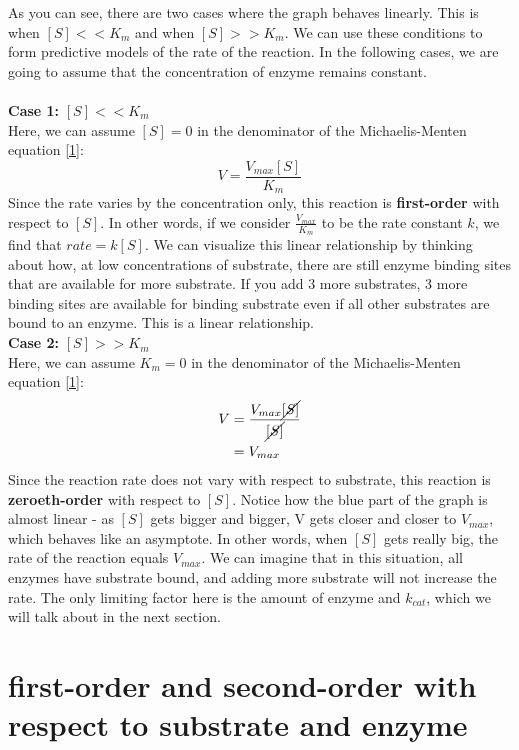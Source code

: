 \documentclass{article}
\begin{document}
As you can see, there are two cases where the graph behaves linearly. This is when $[S]<<K_m$ and when $[S]>>K_m$. We can use these conditions to form predictive models of the rate of the reaction. In the following cases, we are going to assume that the concentration of enzyme remains constant.\\
\\
\hypertarget{case 1}{\textbf{Case 1:}} $[S]<<K_m$\\
Here, we can assume $[S] = 0$ in the denominator of the Michaelis-Menten equation \eqref{1}:\\
\begin{equation}
    V = \frac{V_{max}[S]}{K_m}
\end{equation}
Since the rate varies by the concentration only, this reaction is \textbf{first-order} with respect to $[S]$. In other words, if we consider $\frac{V_{max}}{K_m}$ to be the rate constant $k$, we find that $rate = k[S]$. We can visualize this linear relationship by thinking about how, at low concentrations of substrate, there are still enzyme binding sites that are available for more substrate. If you add 3 more substrates, 3 more binding sites are available for binding substrate even if all other substrates are bound to an enzyme. This is a linear relationship.\\
\newpage
\hypertarget{case 2}{\textbf{Case 2:}} $[S]>>K_m$\\
Here, we can assume $K_m = 0$ in the denominator of the Michaelis-Menten equation \eqref{1}:\\
\begin{align}
    V &= \frac{V_{max}\cancel{[S]}}{\cancel{[S]}} \nonumber \\
    &= V_{max}
\end{align}
Since the reaction rate does not vary with respect to substrate, this reaction is \textbf{zeroeth-order} with respect to $[S]$. Notice how the blue part of the graph is almost linear - as $[S]$ gets bigger and bigger, V gets closer and closer to $V_{max}$, which behaves like an asymptote. In other words, when $[S]$ gets really big, the rate of the reaction equals $V_{max}$. We can imagine that in this situation, all enzymes have substrate bound, and adding more substrate will not increase the rate. The only limiting factor here is the amount of enzyme and $k_{cat}$, which we will talk about in the next section.

\section{first-order and second-order with respect to substrate and enzyme}
\end{document}

